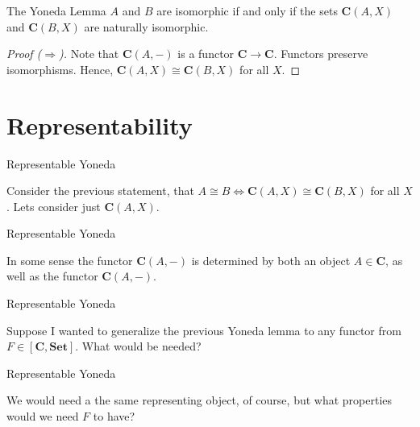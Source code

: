 \documentclass[tikz]{beamer}
\theoremstyle{definition}
\newcommand{\cat}[1]{\mathbf{#1}}
\newcommand{\homf}[2]{[\cat{#1}, \cat{#2}]}
\begin{document}
\begin{frame}[fragile]
    \begin{block}{The Yoneda Lemma}
        $A$ and $B$ are isomorphic if and only if the sets $\mathbf{C}(A, X) $ and $\mathbf{C}(B, X)$ are naturally isomorphic.
    \end{block}{}
    
    \begin{proof}[Proof ($\Rightarrow$)]
    
        Note that $\mathbf{C}(A,-)$ is a functor $\mathbf{C} \to \mathbf{C}$. Functors preserve isomorphisms. Hence, $\mathbf{C}(A, X) \cong \mathbf{C}(B, X)$ for all $X$.

    \end{proof}
\end{frame}



\section{Representability}

\begin{frame}{Representable Yoneda}
    
Consider the previous statement, that $A \cong B \iff \cat{C}(A, X) \cong \cat{C}(B, X)$ for all $X$. Lets consider just $\cat{C}(A, X)$.
    
\end{frame}

\begin{frame}{Representable Yoneda}
    
In some sense the functor $\cat{C}(A, -)$ is determined by both an object $A \in \cat{C}$, as well as the functor $\cat{C}(A,-)$.
    
\end{frame}

\begin{frame}{Representable Yoneda}
    
Suppose I wanted to generalize the previous Yoneda lemma to any functor from $F \in \homf{C}{Set}$. What would be needed?
    
\end{frame}

\begin{frame}{Representable Yoneda}
    
We would need a the same representing object, of course, but what properties would we need $F$ to have?
    
\end{frame}
\end{document}
